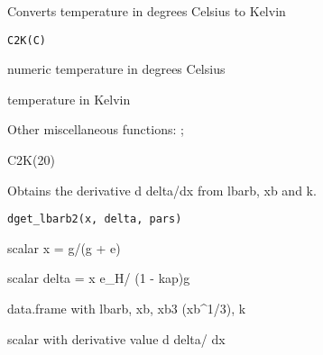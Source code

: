 \documentclass[a4paper]{book}
\begin{document}
%
\begin{Description}\relax
Converts temperature in degrees Celsius to Kelvin
\end{Description}
%
\begin{Usage}
\begin{verbatim}
C2K(C)
\end{verbatim}
\end{Usage}
%
\begin{Arguments}
\begin{ldescription}
\item[\code{C}] numeric temperature in degrees Celsius
\end{ldescription}
\end{Arguments}
%
\begin{Value}
temperature in Kelvin
\end{Value}
%
\begin{SeeAlso}\relax
Other miscellaneous functions: ;
\end{SeeAlso}
%
\begin{Examples}
\begin{ExampleCode}
C2K(20)
\end{ExampleCode}
\end{Examples}
%
\begin{Description}\relax
Obtains the derivative d delta/dx from lbarb, xb and k.
\end{Description}
%
\begin{Usage}
\begin{verbatim}
dget_lbarb2(x, delta, pars)
\end{verbatim}
\end{Usage}
%
\begin{Arguments}
\begin{ldescription}
\item[\code{x}] scalar x = g/(g + e)

\item[\code{delta}] scalar delta = x e\_H/ (1 - kap)g

\item[\code{pars}] data.frame with lbarb, xb, xb3 (xb\textasciicircum{}1/3), k
\end{ldescription}
\end{Arguments}
%
\begin{Value}
scalar with derivative value d delta/ dx
\end{Value}
\end{document}
